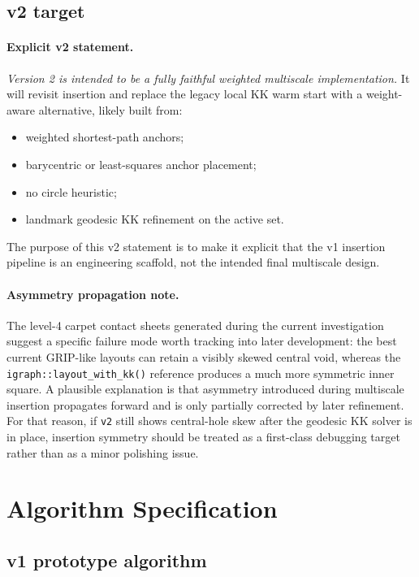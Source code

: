 \documentclass[11pt]{article}
\newcommand{\code}[1]{\begingroup\urlstyle{tt}\nolinkurl{#1}\endgroup}
\begin{document}
\subsection{v2 target}

\paragraph{Explicit v2 statement.}
\emph{Version 2 is intended to be a fully faithful weighted multiscale
implementation.} It will revisit insertion and replace the legacy local KK warm
start with a weight-aware alternative, likely built from:
\begin{itemize}[leftmargin=1.4em]
  \item weighted shortest-path anchors;
  \item barycentric or least-squares anchor placement;
  \item no circle heuristic;
  \item landmark geodesic KK refinement on the active set.
\end{itemize}

The purpose of this v2 statement is to make it explicit that the v1 insertion
pipeline is an engineering scaffold, not the intended final multiscale design.

\paragraph{Asymmetry propagation note.}
The level-4 carpet contact sheets generated during the current investigation
suggest a specific failure mode worth tracking into later development: the best
current GRIP-like layouts can retain a visibly skewed central void, whereas the
\code{igraph::layout\_with\_kk()} reference produces a much more symmetric inner
square. A plausible explanation is that asymmetry introduced during multiscale
insertion propagates forward and is only partially corrected by later
refinement. For that reason, if \code{v2} still shows central-hole skew after
the geodesic KK solver is in place, insertion symmetry should be treated as a
first-class debugging target rather than as a minor polishing issue.

\section{Algorithm Specification}

\subsection{v1 prototype algorithm}
\end{document}
